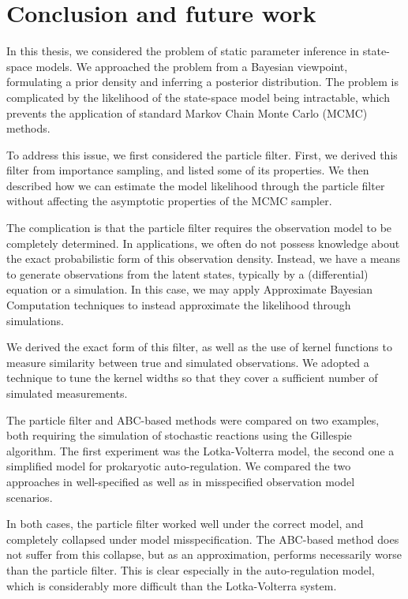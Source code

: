 \chapter{Conclusion and future work}
\label{chap:conclusion}

In this thesis, we considered the problem of static parameter inference in state-space models. We approached the problem from a Bayesian viewpoint, formulating a prior density and inferring a posterior distribution. The problem is complicated by the likelihood of the state-space model being intractable, which prevents the application of standard Markov Chain Monte Carlo (MCMC) methods.

To address this issue, we first considered the particle filter. First, we derived this filter from importance sampling, and listed some of its properties. We then described how we can estimate the model likelihood through the particle filter without affecting the asymptotic properties of the MCMC sampler.

The complication is that the particle filter requires the observation model to be completely determined. In applications, we often do not possess knowledge about the exact probabilistic form of this observation density. Instead, we have a means to generate observations from the latent states, typically by a (differential) equation or a simulation. In this case, we may apply Approximate Bayesian Computation techniques to instead approximate the likelihood through simulations.

We derived the exact form of this filter, as well as the use of kernel functions to measure similarity between true and simulated observations. We adopted a technique to tune the kernel widths so that they cover a sufficient number of simulated measurements.

The particle filter and ABC-based methods were compared on two examples, both requiring the simulation of stochastic reactions using the Gillespie algorithm. The first experiment was the Lotka-Volterra model, the second one a simplified model for prokaryotic auto-regulation. We compared the two approaches in well-specified as well as in misspecified observation model scenarios.

In both cases, the particle filter worked well under the correct model, and completely collapsed under model misspecification. The ABC-based method does not suffer from this collapse, but as an approximation, performs necessarily worse than the particle filter. This is clear especially in the auto-regulation model, which is considerably more difficult than the Lotka-Volterra system.

